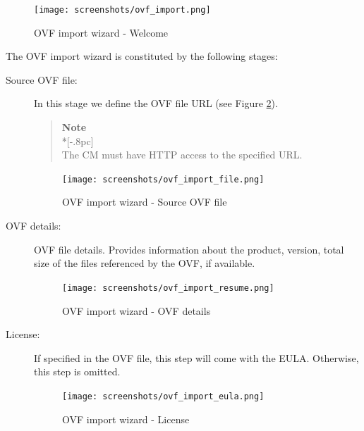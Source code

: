 \begin{figure}[H]
	\begin{center}
	\texttt{[image: screenshots/ovf\_import.png]}
	\caption{OVF import wizard - Welcome}
	\label{fig:ovf_import_wiz}
	\end{center}
\end{figure}
The OVF import wizard is constituted by the following stages:

\begin{description}
	\item[Source OVF file:] In this stage we define the OVF file URL (see Figure \ref{fig:ovf_import_file}).
		
        \begin{quote}
            {\large \bf Note} \\*[-.8pc]
            \underline{\hspace{6in}} \\
            The CM must have HTTP access to the specified URL.
        \end{quote}

        \begin{figure}[H]
            \begin{center}
            \texttt{[image: screenshots/ovf\_import\_file.png]}
            \caption{OVF import wizard - Source OVF file}
            \label{fig:ovf_import_file}
            \end{center}
        \end{figure}

	\item[OVF details:] OVF file details. Provides information about the product, version, total size of the files referenced by the OVF, if available.
		\begin{figure}[H]
            \begin{center}
            \texttt{[image: screenshots/ovf\_import\_resume.png]}
            \caption{OVF import wizard - OVF details}
            \label{fig:ovf_import_resume}
            \end{center}
        \end{figure}

    \item[License:] If specified in the OVF file, this step will come with the EULA. Otherwise, this step is omitted.
		\begin{figure}[H]
            \begin{center}
            \texttt{[image: screenshots/ovf\_import\_eula.png]}
            \caption{OVF import wizard - License}
            \label{fig:ovf_import_eula}
            \end{center}
        \end{figure}


\end{description}
